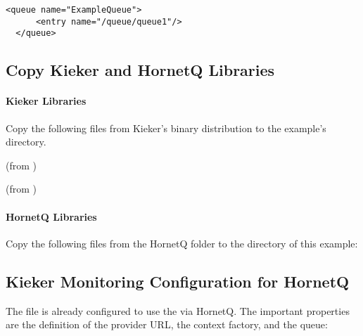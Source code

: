 \setXMLListing
\begin{lstlisting}[caption=Queue definition in the HornetQ configuration file,label=lst:hornetq:config:queue]
  <queue name="ExampleQueue">
      <entry name="/queue/queue1"/>
  </queue>
\end{lstlisting}

\subsection{Copy Kieker and HornetQ Libraries}

\paragraph*{Kieker Libraries}

Copy the following files from Kieker's binary distribution to %
the example's  directory.

\begin{compactenum}
 \item \file{\mainJar} (from )
 \item \file{\commonsLoggingJar} (from )
\end{compactenum}

\paragraph*{HornetQ Libraries}

Copy the following files from the HornetQ  folder to the %
 directory of this example:

\begin{compactenum}
\item {}
\item {}
\item {}
\item {}
\item {}
\end{compactenum}

\subsection{Kieker Monitoring Configuration for HornetQ}

The file  %
is already configured to use the  via HornetQ. The important properties are %
the definition of the provider URL, the context factory, and the queue:

